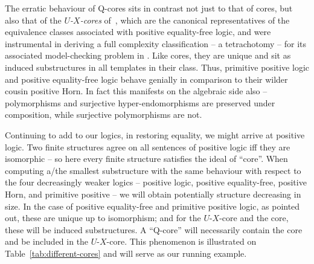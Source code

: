 \documentclass{LMCS}
\begin{document}
The erratic behaviour of Q-cores sits in contrast not just to that of
cores, but also that of the \emph{$U$-$X$-cores} of~\cite{LICS2011},
which are the canonical representatives of the equivalence classes
associated with positive equality-free logic,  and were instrumental in deriving a full complexity
classification -- a tetrachotomy -- for its associated model-checking problem in \cite{LICS2011}. 
Like cores, they are unique 
and sit as induced substructures in all templates in their
class. Thus, primitive positive logic and positive equality-free logic
behave genially in comparison to their wilder cousin positive Horn. In
fact this manifests on the algebraic side also -- polymorphisms and
surjective hyper-endomorphisms 
are preserved under composition, while surjective polymorphisms are not. 

Continuing to add to our logics, in restoring equality, we might
arrive at positive logic. Two finite structures agree on all sentences
of positive logic iff they are isomorphic -- so here every finite
structure satisfies the ideal of ``core''. 
When computing a/the smallest substructure with the same behaviour with
respect to the four decreasingly weaker logics -- positive logic,
positive equality-free, positive Horn, and primitive positive --
we will obtain potentially structure decreasing in size. In the case
of positive equality-free and primitive positive logic, as pointed
out, these are unique up to isomorphism; and for the $U$-$X$-core
and the core, these will be induced substructures. A ``Q-core'' will
necessarily contain the core and be included in the $U$-$X$-core.  
This phenomenon is illustrated on Table~\ref{tab:different-cores} and
will serve as our running example.
\end{document}
